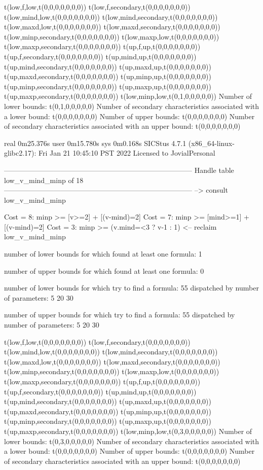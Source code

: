 t(low,f,low,t(0,0,0,0,0,0,0))
t(low,f,secondary,t(0,0,0,0,0,0,0))
t(low,mind,low,t(0,0,0,0,0,0,0))
t(low,mind,secondary,t(0,0,0,0,0,0,0))
t(low,maxd,low,t(0,0,0,0,0,0,0))
t(low,maxd,secondary,t(0,0,0,0,0,0,0))
t(low,minp,secondary,t(0,0,0,0,0,0,0))
t(low,maxp,low,t(0,0,0,0,0,0,0))
t(low,maxp,secondary,t(0,0,0,0,0,0,0))
t(up,f,up,t(0,0,0,0,0,0,0))
t(up,f,secondary,t(0,0,0,0,0,0,0))
t(up,mind,up,t(0,0,0,0,0,0,0))
t(up,mind,secondary,t(0,0,0,0,0,0,0))
t(up,maxd,up,t(0,0,0,0,0,0,0))
t(up,maxd,secondary,t(0,0,0,0,0,0,0))
t(up,minp,up,t(0,0,0,0,0,0,0))
t(up,minp,secondary,t(0,0,0,0,0,0,0))
t(up,maxp,up,t(0,0,0,0,0,0,0))
t(up,maxp,secondary,t(0,0,0,0,0,0,0))
t(low,minp,low,t(0,1,0,0,0,0,0))
Number of lower bounds:                                             t(0,1,0,0,0,0,0)
Number of secondary characteristics associated with a lower bound:  t(0,0,0,0,0,0,0)
Number of upper bounds:                                             t(0,0,0,0,0,0,0)
Number of secondary characteristics associated with an upper bound: t(0,0,0,0,0,0,0)

real	0m25.376s
user	0m15.780s
sys	0m0.168s
SICStus 4.7.1 (x86_64-linux-glibc2.17): Fri Jan 21 10:45:10 PST 2022
Licensed to JovialPersonal


--------------------------------------------------------------------------------
Handle table low_v_mind_minp of 18
--------------------------------------------------------------------------------
--> consult low_v_mind_minp

Cost =  8:  minp >= [v>=2] + [(v-mind)=2]
Cost =  7:  minp >= [mind>=1] + [(v-mind)=2]
Cost =  3:  minp >= (v.mind=<3 ? v-1 : 1)
<-- reclaim low_v_mind_minp

number of lower bounds for which found at least one formula: 1

number of upper bounds for which found at least one formula: 0

number of lower bounds for which try to find a formula: 55
dispatched by number of parameters: 5  20  30

number of upper bounds for which try to find a formula: 55
dispatched by number of parameters: 5  20  30

t(low,f,low,t(0,0,0,0,0,0,0))
t(low,f,secondary,t(0,0,0,0,0,0,0))
t(low,mind,low,t(0,0,0,0,0,0,0))
t(low,mind,secondary,t(0,0,0,0,0,0,0))
t(low,maxd,low,t(0,0,0,0,0,0,0))
t(low,maxd,secondary,t(0,0,0,0,0,0,0))
t(low,minp,secondary,t(0,0,0,0,0,0,0))
t(low,maxp,low,t(0,0,0,0,0,0,0))
t(low,maxp,secondary,t(0,0,0,0,0,0,0))
t(up,f,up,t(0,0,0,0,0,0,0))
t(up,f,secondary,t(0,0,0,0,0,0,0))
t(up,mind,up,t(0,0,0,0,0,0,0))
t(up,mind,secondary,t(0,0,0,0,0,0,0))
t(up,maxd,up,t(0,0,0,0,0,0,0))
t(up,maxd,secondary,t(0,0,0,0,0,0,0))
t(up,minp,up,t(0,0,0,0,0,0,0))
t(up,minp,secondary,t(0,0,0,0,0,0,0))
t(up,maxp,up,t(0,0,0,0,0,0,0))
t(up,maxp,secondary,t(0,0,0,0,0,0,0))
t(low,minp,low,t(0,3,0,0,0,0,0))
Number of lower bounds:                                             t(0,3,0,0,0,0,0)
Number of secondary characteristics associated with a lower bound:  t(0,0,0,0,0,0,0)
Number of upper bounds:                                             t(0,0,0,0,0,0,0)
Number of secondary characteristics associated with an upper bound: t(0,0,0,0,0,0,0)

